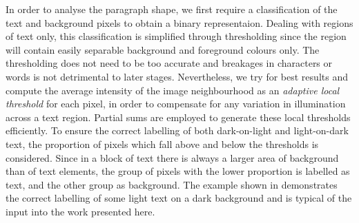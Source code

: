 In order to analyse the paragraph shape, we first require a classification of
the text and background pixels to obtain a binary representaion.  Dealing with regions of text only, this
classification is simplified through thresholding since the region will contain
easily separable background and foreground colours only. The thresholding does not
need to be too accurate and breakages in characters or words is not detrimental
to later stages. Nevertheless, we try for best results and  compute the average
intensity of the image neighbourhood as an {\em adaptive local threshold}
for each pixel, in
order to compensate for any variation in illumination across a text region.
Partial sums \cite{partialSums} are employed to generate these local thresholds
efficiently.  To ensure the correct labelling of both dark-on-light and
light-on-dark text, the proportion of pixels which fall above and below the
thresholds is considered.  Since in a block of text there is always a larger
area of background than of text elements, the group of pixels with the lower
proportion is labelled as text, and the other group as background.  The example
shown in  demonstrates the correct labelling of some light text
on a dark background and is typical of the input into the work presented here.


